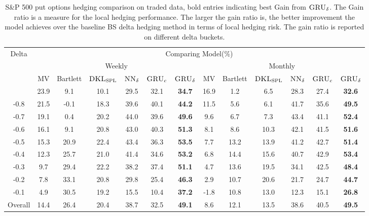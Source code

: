 \documentclass[letterpaper,12pt,titlepage,oneside,final]{book}
\numberwithin{equation}{section}
\theoremstyle{definition}
\newcommand{\model}{\textsc{GRU}_\delta}
\newcommand{\modelN}{\textsc{NN}_\delta}
\newcommand{\DKLs}{\bf\textsc{DKL}_{\text{SPL}}}
\begin{document}
\begin{table}[htp!]
	\centering
	\small
	\begin{threeparttable}
		\begin{tabular}{|c|cccccc| cccccc|}
			\hline
			\multirow{4}{*}{Delta}&\multicolumn{12}{c|}{Comparing Model(\%)}\\
			&\multicolumn{6}{c}{Weekly }&\multicolumn{6}{c|}{Monthly}\\ %
			&{\tiny MV}& {\tiny Bartlett}&\multicolumn{1}{c}{\tiny $\DKLs$}
			&\multicolumn{1}{c}{\tiny $\modelN$ } &\multicolumn{1}{c}{\tiny $\textsc{GRU}_{c}$} &\multicolumn{1}{c}{\tiny $\model$}
            &{\tiny MV}& {\tiny Bartlett} &\multicolumn{1}{c}{\tiny $\DKLs$}
            &\multicolumn{1}{c}{\tiny $\modelN$} &\multicolumn{1}{c}{\tiny $\textsc{GRU}_{c}$} & \multicolumn{1}{c|}{\tiny $\model$ } \\ \hline
			-0.9   &23.9  &9.1  &10.1   &29.5 &32.1 &\textbf{34.7}  &16.9 &1.2 &6.5   &28.3         & 27.4& \textbf{32.6}  \\

			-0.8   &21.5  &-0.1 &18.3   &39.6 &40.1 &\textbf{44.2}  &11.5 &5.6 &6.1   &41.7        &35.6 & \textbf{49.5}  \\

			-0.7   &19.1  &0.4  &20.2   &44.0 &39.6 &\textbf{49.6}  &9.6  &6.7 &7.3   &43.4        &41.1 & \textbf{52.4}  \\
			-0.6   &16.1  &9.1  &20.8   &43.0 &40.3 &\textbf{51.3}  &8.1  &8.6 &10.3  &42.1        &41.5 & \textbf{51.6}  \\
			-0.5   &15.3  &20.9 &22.4   &43.4&36.3 &\textbf{53.5}  &7.7  &13.2 &13.9  &41.2        &42.7 & \textbf{51.4}  \\
			-0.4   &12.3  &25.7 &21.0   &41.4&34.6 &\textbf{53.2}  &6.8  &14.4 &15.6  &40.7        &42.9 & \textbf{53.4}  \\
			-0.3   &9.7   &29.4 &22.2   &38.2&37.4 &\textbf{51.1}  &4.7  &13.6 &19.5  &34.1       &42.5  & \textbf{48.4}  \\
			-0.2   &7.8   &33.1 &20.8   &29.8 &25.4&\textbf{46.3}  &2.9  &10.7 &20.6  &21.7         & 24.7 &\textbf{44.7}  \\
			-0.1   &4.9   &30.5 &19.2   &15.5&10.4 &\textbf{37.2}  &-1.8 &10.8 &13.0  &12.3         &15.1& \textbf{26.8}  \\
			Overall&14.4  &26.4 &20.4   &38.7 &32.5&\textbf{49.1}  &8.6  &12.1 &13.5  &38.6        &40.5 & \textbf{49.5}  \\
			\hline
		\end{tabular}
		\caption{S\&P 500 put options hedging comparison on traded data, bold entries indicating best Gain from $\model$. The Gain ratio is a measure for the local hedging performance. The larger the gain ratio is, the better improvement the model achieves over the baseline BS delta hedging method in terms of local hedging risk. The gain ratio is reported on different delta buckets. }
\label{SP500PutC}
\end{threeparttable}
\end{table}
\end{document}
